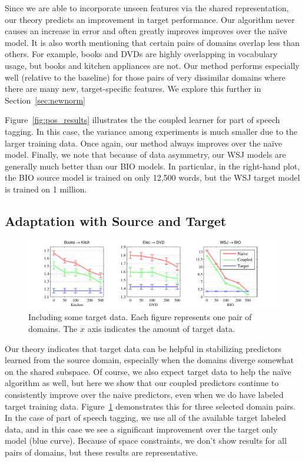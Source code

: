 Since we are able to incorporate unseen features via the shared
representation, our theory predicts an improvement in target
performance.  Our algorithm never causes an increase in error and
often greatly improves improves over the na\"{i}ve model.  It is also
worth mentioning that certain pairs of domains overlap less than
others.  For example, books and DVDs are highly overlapping in
vocabulary usage, but books and kitchen appliances are not.  Our
method performs especially well (relative to the baseline) for those
pairs of very dissimilar domains where there are many new,
target-specific features.  We explore this further in
Section~\ref{sec:newnorm}

Figure~\ref{fig:pos_results} illustrates the the coupled learner for
part of speech tagging.  In this case, the variance among experiments
is much smaller due to the larger training data.  Once again, our
method always improves over the na\"{i}ve model.  Finally, we note
that because of data asymmetry, our WSJ models are generally much
better than our BIO models.  In particular, in the right-hand plot,
the BIO source model is trained on only 12,500 words, but the WSJ
target model is trained on 1 million.

\subsection{Adaptation with Source and Target}

\begin{figure}
\hspace{-0.5in}
\includegraphics[width=6.5in]{figures/withtarget.pdf}
\caption{Including some target data.  Each figure represents one pair of domains.  The $x$ axis indicates the amount of target data.}
\label{fig:withtarget}
\end{figure}

Our theory indicates that target data can be helpful in stabilizing
predictors learned from the source domain, especially when the domains
diverge somewhat on the shared subspace.  Of course, we also expect
target data to help the na\"{i}ve algorithm as well, but here we show
that our coupled predictors continue to consistently improve over the
naive predictors, even when we do have labeled target training data.
Figure~\ref{fig:withtarget} demonstrates this for three selected
domain pairs.  In the case of part of speech tagging, we use all of
the available target labeled data, and in this case we see a
significant improvement over the target only model (blue curve).
Because of space constraints, we don't show results for all pairs of
domains, but these results are representative.

